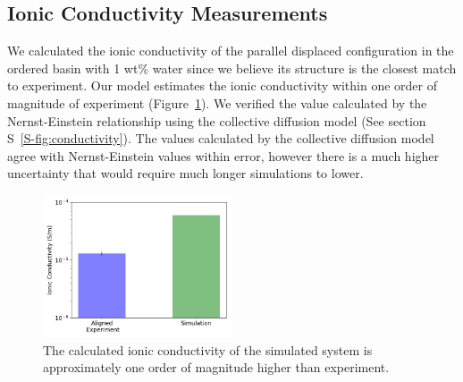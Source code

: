 \documentclass[journal=jpcbfk,manuscript=article]{achemso}
\begin{document}
  \subsection{Ionic Conductivity Measurements}
 

  
  
  
  We calculated the ionic conductivity of the parallel displaced configuration in
  the ordered basin with 1 wt\% water since we believe its structure is the 
  closest match to experiment. Our model estimates the ionic conductivity within
  one order of magnitude of experiment (Figure~\ref{fig:ionic_conductivity}). We
  verified the value calculated by the Nernst-Einstein relationship using 
  the collective diffusion model\cite{liu_collective_2013} 
  (See section S~\ref{S-fig:conductivity}). The values calculated by the 
  collective diffusion model agree with Nernst-Einstein  values within error, 
  however there is a much higher uncertainty that would require much longer 
  simulations to lower.
  

  \begin{figure}
  \centering
  \includegraphics[width=0.5\textwidth]{IC_nernst.png}
  \caption{The calculated ionic conductivity of the simulated system is approximately
  one order of magnitude higher than experiment.}\label{fig:ionic_conductivity}
  \end{figure}
\end{document}
